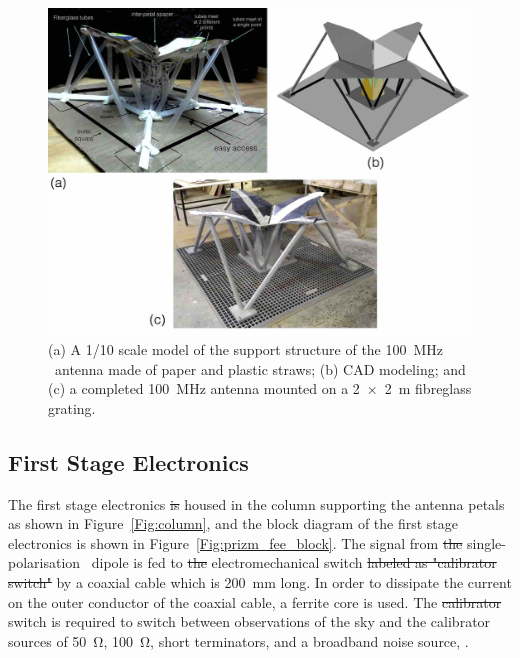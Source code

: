 \begin{figure}
	\centering
	\includegraphics[width=0.7\linewidth]{Figures/structure}
	\caption{(a) A 1/10 scale model of the support structure of the \SI{100}{\mega \hertz} \prizm\ antenna made of paper and plastic straws; (b) CAD modeling; and (c) a completed \SI{100}{\mega \hertz} antenna mounted on a \SI{2x2}{\meter} fibreglass grating. }
	\label{Fig:structure}
\end{figure}

\subsection{First Stage Electronics}

The first stage electronics \st{is}  housed in the column supporting the antenna petals as shown in Figure~\ref{Fig:column}, and the block diagram of the first stage electronics is shown in Figure~\ref{Fig:prizm_fee_block}. The signal from \st{the}  single-polarisation \prizm\ dipole is fed to \st{the}  electromechanical switch \st{labeled as "calibrator switch"}  by a coaxial cable which is \SI{200}{\milli \meter} long. In order to dissipate the current on the outer conductor of the coaxial cable, a ferrite core is used. The \st{calibrator}  switch is required to switch between observations of the sky and the calibrator sources of \SI{50}{\ohm}, \SI{100}{\ohm}, short terminators, and a broadband noise source, . 

